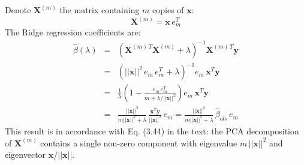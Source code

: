 

Denote $\mathbf{X}^{(m)}$ the matrix containing $m$ copies of $\mathbf{x}$:
\begin{equation*}
\mathbf{X}^{(m)} = \mathbf{x}\, e_m^T
\end{equation*}
The Ridge regression coefficients are:
\begin{eqnarray*}
\hat{\beta}(\lambda) & = & \left(\mathbf{X}^{(m)\,T} \mathbf{X}^{(m)} + \lambda\right)^{-1}
\mathbf{X}^{(m) \, T} \mathbf{y} \\
& = & \left(||\mathbf{x}||^2 \, e_m \, e_m^T + \lambda\right)^{-1}
e_m \,\mathbf{x}^T\mathbf{y} \\
& = & \frac{1}{\lambda} \left(1 - \frac{e_m \, e_m^T}{m + \lambda / ||\mathbf{x}||^2}\right)e_m \,\mathbf{x}^T\mathbf{y} \\
& = & \frac{||\mathbf{x}||^2}{m ||\mathbf{x}||^2 + \lambda}
    \,\frac{\mathbf{x}^T \mathbf{y}}{||\mathbf{x}||^2} \, e_m = \frac{||\mathbf{x}||^2}{m ||\mathbf{x}||^2 + \lambda}
    \,\hat{\beta}_{ols} \, e_m
\end{eqnarray*}
This result is in accordance with Eq. (3.44) in the text: the PCA decomposition
of $\mathbf{X}^{(m)}$ contains a single non-zero component with eigenvalue
$m\,||\mathbf{x}||^2$ and eigenvector $\mathbf{x} / ||\mathbf{x}||$.